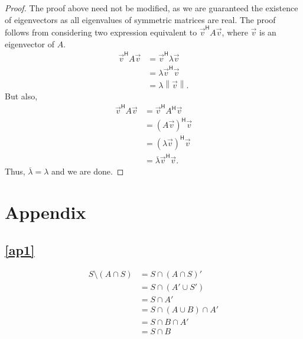 \documentclass{article}
\theoremstyle{definition}
\begin{document}
\begin{proof}
	The proof above need not be modified, as we are guaranteed the existence of eigenvectors as all eigenvalues of symmetric matrices are real. The proof follows from considering two expression equivalent to $\vec v^\mathsf{H}A\vec v$, where $\vec v$ is an eigenvector of $A$.
	\begin{align*}
		\vec v^\mathsf{H}A\vec v&=\vec v^\mathsf{H}\lambda\vec v\\
		&=\lambda\vec v^\mathsf{H}\vec v\\
		&=\lambda\left\lVert\vec v\right\rVert.
	\end{align*}
	But also,
	\begin{align*}
		\vec v^\mathsf{H}A\vec v&=\vec v^\mathsf{H}A^\mathsf{H}\vec v\\
		&=(A\vec v)^\mathsf{H}\vec v\\
		&=(\lambda\vec v)^\mathsf{H}\vec v\\
		&=\overline{\lambda}\vec v^\mathsf{H}\vec v.
	\end{align*}
	Thus, $\overline{\lambda}=\lambda$ and we are done.
\end{proof}

\newpage
\appendix
\section{Appendix}
\subsection{\ref{ap1}}
\begin{align}\label{eq:1}
	S\setminus (A\cap S)&=S\cap(A\cap S)'\\\nonumber
	&=S\cap(A'\cup S')\\\nonumber
	&=S\cap A'\\\nonumber
	&=S\cap (A\cup B)\cap A'\\\nonumber
	&=S\cap B\cap A'\\\nonumber
	&=S\cap B\tag*{$(B\subseteq A')$}\nonumber
\end{align}

\newpage

\end{document}
